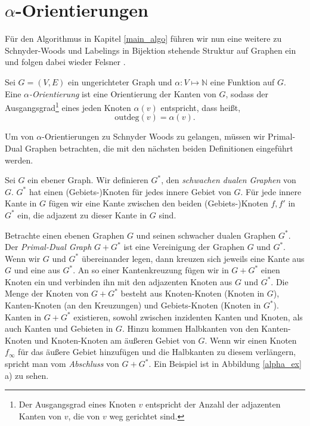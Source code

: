 \section{$\alpha$-Orientierungen}\label{alpha_orientations}

Für den Algorithmus in Kapitel \ref{main_algo} führen wir nun eine weitere zu Schnyder-Woods und Labelings in Bijektion stehende Struktur auf Graphen ein und folgen dabei wieder Felsner \cite{felsner04}.

\begin{definition}
Sei $G=(V,E)$ ein ungerichteter Graph und $\alpha:V\mapsto\mathbb{N}$ eine Funktion auf $G$. Eine $\alpha$\textit{-Orientierung} ist eine Orientierung der Kanten von $G$, sodass der Ausgangsgrad\footnote{Der Ausgangsgrad eines Knoten $v$ entspricht der Anzahl der adjazenten Kanten von $v$, die von $v$ weg gerichtet sind.} eines jeden Knoten $\alpha(v)$ entspricht, dass heißt, $$\text{outdeg}(v) = \alpha(v).$$
\end{definition}

Um von $\alpha$-Orientierungen zu Schnyder Woods zu gelangen, müssen wir Primal-Dual Graphen betrachten, die mit den nächsten beiden Definitionen eingeführt werden.

\begin{definition}
Sei $G$ ein ebener Graph. Wir definieren $G^*$, den \textit{schwachen dualen Graphen} von $G$. $G^*$ hat einen (Gebiets-)Knoten für jedes innere Gebiet von $G$. Für jede innere Kante in $G$ fügen wir eine Kante zwischen den beiden (Gebiets-)Knoten $f,f'$ in $G^*$ ein, die adjazent zu dieser Kante in $G$ sind.
\end{definition}

\begin{definition}
Betrachte einen ebenen Graphen $G$ und seinen schwacher dualen Graphen $G^*$. Der \textit{Primal-Dual Graph} $G+G^*$ ist eine Vereinigung der Graphen $G$ und $G^*$. Wenn wir $G$ und $G^*$ übereinander legen, dann kreuzen sich jeweils eine Kante aus $G$ und eine aus $G^*$. An so einer Kantenkreuzung fügen wir in $G+G^*$ einen Knoten ein und verbinden ihn mit den adjazenten Knoten aus $G$ und $G^*$. Die Menge der Knoten von $G+G^*$ besteht aus Knoten-Knoten (Knoten in $G$), Kanten-Knoten (an den Kreuzungen) und Gebiets-Knoten (Knoten in $G^*$). Kanten in $G+G^*$ existieren, sowohl zwischen inzidenten Kanten und Knoten, als auch Kanten und Gebieten in $G$. Hinzu kommen Halbkanten von den Kanten-Knoten und Knoten-Knoten am äußeren Gebiet von $G$. Wenn wir einen Knoten $f_\infty$ für das äußere Gebiet hinzufügen und die Halbkanten zu diesem verlängern, spricht man vom \textit{Abschluss} von $G+G^*$. Ein Beispiel ist in Abbildung \ref{alpha_ex} a) zu sehen.

\end{definition}

